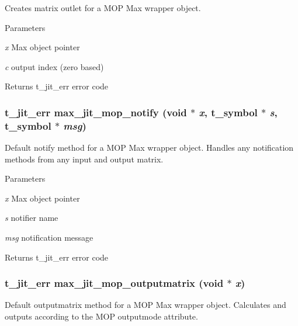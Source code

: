 Creates matrix outlet for a MOP Max wrapper object. 
\begin{DoxyParams}{Parameters}
\item[{\em x}]Max object pointer \item[{\em c}]output index (zero based)\end{DoxyParams}
\begin{DoxyReturn}{Returns}
t\_\-jit\_\-err error code 
\end{DoxyReturn}
\hypertarget{group__maxmopmod_ga5032d682c77bcb7e2dcdf0e77d863d3c}{
\subsubsection[{max\_\-jit\_\-mop\_\-notify}]{\setlength{\rightskip}{0pt plus 5cm}t\_\-jit\_\-err max\_\-jit\_\-mop\_\-notify (void $\ast$ {\em x}, \/  {\bf t\_\-symbol} $\ast$ {\em s}, \/  {\bf t\_\-symbol} $\ast$ {\em msg})}}
\label{group__maxmopmod_ga5032d682c77bcb7e2dcdf0e77d863d3c}


Default notify method for a MOP Max wrapper object. Handles any notification methods from any input and output matrix.


\begin{DoxyParams}{Parameters}
\item[{\em x}]Max object pointer \item[{\em s}]notifier name \item[{\em msg}]notification message\end{DoxyParams}
\begin{DoxyReturn}{Returns}
t\_\-jit\_\-err error code 
\end{DoxyReturn}
\hypertarget{group__maxmopmod_ga1b3db3947c815f9aeab49643f1b29402}{
\subsubsection[{max\_\-jit\_\-mop\_\-outputmatrix}]{\setlength{\rightskip}{0pt plus 5cm}t\_\-jit\_\-err max\_\-jit\_\-mop\_\-outputmatrix (void $\ast$ {\em x})}}
\label{group__maxmopmod_ga1b3db3947c815f9aeab49643f1b29402}


Default outputmatrix method for a MOP Max wrapper object. Calculates and outputs according to the MOP outputmode attribute.



